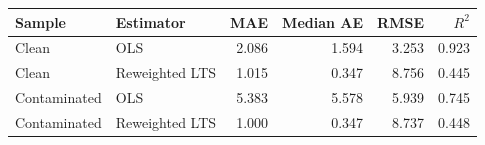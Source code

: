 \begin{tabular}{llrrrr}
\toprule
Sample & Estimator & MAE & Median AE & RMSE & $R^2$ \\
\midrule
Clean & OLS & 2.086 & 1.594 & 3.253 & 0.923 \\
Clean & Reweighted LTS & 1.015 & 0.347 & 8.756 & 0.445 \\
Contaminated & OLS & 5.383 & 5.578 & 5.939 & 0.745 \\
Contaminated & Reweighted LTS & 1.000 & 0.347 & 8.737 & 0.448 \\
\bottomrule
\end{tabular}
